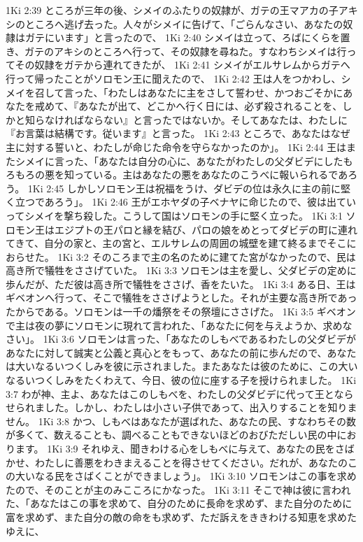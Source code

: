 1Ki 2:39  ところが三年の後、シメイのふたりの奴隷が、ガテの王マアカの子アキシのところへ逃げ去った。人々がシメイに告げて、「ごらんなさい、あなたの奴隷はガテにいます」と言ったので、
1Ki 2:40  シメイは立って、ろばにくらを置き、ガテのアキシのところへ行って、その奴隷を尋ねた。すなわちシメイは行ってその奴隷をガテから連れてきたが、
1Ki 2:41  シメイがエルサレムからガテへ行って帰ったことがソロモン王に聞えたので、
1Ki 2:42  王は人をつかわし、シメイを召して言った、「わたしはあなたに主をさして誓わせ、かつおごそかにあなたを戒めて、『あなたが出て、どこかへ行く日には、必ず殺されることを、しかと知らなければならない』と言ったではないか。そしてあなたは、わたしに『お言葉は結構です。従います』と言った。
1Ki 2:43  ところで、あなたはなぜ主に対する誓いと、わたしが命じた命令を守らなかったのか」。
1Ki 2:44  王はまたシメイに言った、「あなたは自分の心に、あなたがわたしの父ダビデにしたもろもろの悪を知っている。主はあなたの悪をあなたのこうべに報いられるであろう。
1Ki 2:45  しかしソロモン王は祝福をうけ、ダビデの位は永久に主の前に堅く立つであろう」。
1Ki 2:46  王がエホヤダの子ベナヤに命じたので、彼は出ていってシメイを撃ち殺した。こうして国はソロモンの手に堅く立った。
1Ki 3:1  ソロモン王はエジプトの王パロと縁を結び、パロの娘をめとってダビデの町に連れてきて、自分の家と、主の宮と、エルサレムの周囲の城壁を建て終るまでそこにおらせた。
1Ki 3:2  そのころまで主の名のために建てた宮がなかったので、民は高き所で犠牲をささげていた。
1Ki 3:3  ソロモンは主を愛し、父ダビデの定めに歩んだが、ただ彼は高き所で犠牲をささげ、香をたいた。
1Ki 3:4  ある日、王はギベオンへ行って、そこで犠牲をささげようとした。それが主要な高き所であったからである。ソロモンは一千の燔祭をその祭壇にささげた。
1Ki 3:5  ギベオンで主は夜の夢にソロモンに現れて言われた、「あなたに何を与えようか、求めなさい」。
1Ki 3:6  ソロモンは言った、「あなたのしもべであるわたしの父ダビデがあなたに対して誠実と公義と真心とをもって、あなたの前に歩んだので、あなたは大いなるいつくしみを彼に示されました。またあなたは彼のために、この大いなるいつくしみをたくわえて、今日、彼の位に座する子を授けられました。
1Ki 3:7  わが神、主よ、あなたはこのしもべを、わたしの父ダビデに代って王とならせられました。しかし、わたしは小さい子供であって、出入りすることを知りません。
1Ki 3:8  かつ、しもべはあなたが選ばれた、あなたの民、すなわちその数が多くて、数えることも、調べることもできないほどのおびただしい民の中におります。
1Ki 3:9  それゆえ、聞きわける心をしもべに与えて、あなたの民をさばかせ、わたしに善悪をわきまえることを得させてください。だれが、あなたのこの大いなる民をさばくことができましょう」。
1Ki 3:10  ソロモンはこの事を求めたので、そのことが主のみこころにかなった。
1Ki 3:11  そこで神は彼に言われた、「あなたはこの事を求めて、自分のために長命を求めず、また自分のために富を求めず、また自分の敵の命をも求めず、ただ訴えをききわける知恵を求めたゆえに、
